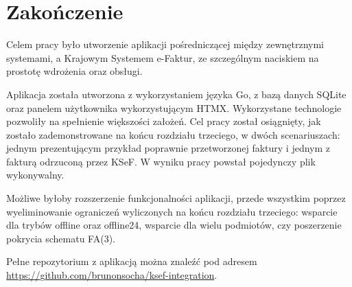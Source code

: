 \chapter*{Zakończenie}
Celem pracy było utworzenie aplikacji pośredniczącej między zewnętrznymi systemami, a Krajowym Systemem e-Faktur, ze szczególnym naciskiem na prostotę wdrożenia oraz obsługi. 

Aplikacja została utworzona z wykorzystaniem języka Go, z bazą danych SQLite oraz panelem użytkownika wykorzystującym HTMX. Wykorzystane technologie pozwoliły na spełnienie większości założeń. Cel pracy został osiągnięty, jak zostało zademonstrowane na końcu rozdziału trzeciego, w dwóch scenariuszach: jednym prezentującym przykład poprawnie przetworzonej faktury i jednym z fakturą odrzuconą przez KSeF. W wyniku pracy powstał pojedynczy plik wykonywalny.

Możliwe byłoby rozszerzenie funkcjonalności aplikacji, przede wszystkim poprzez wyeliminowanie ograniczeń wyliczonych na końcu rozdziału trzeciego: wsparcie dla trybów offline oraz offline24, wsparcie dla wielu podmiotów, czy poszerzenie pokrycia schematu FA(3).

Pełne repozytorium z aplikacją można znaleźć pod adresem \url{https://github.com/brunonsocha/ksef-integration}.
